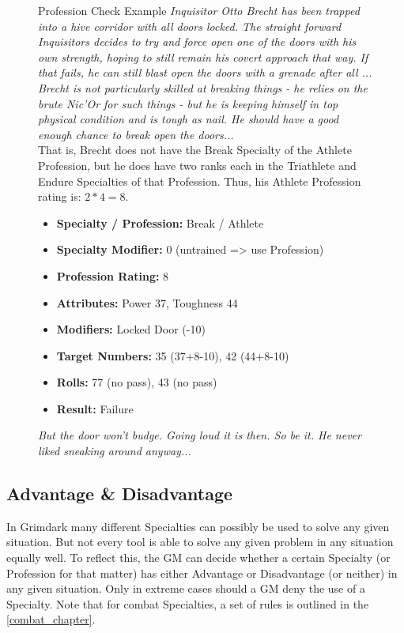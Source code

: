 \begin{figure}[hb]
	\begin{DndSidebar}{Profession Check Example}
	\textit{Inquisitor Otto Brecht has been trapped into a hive corridor with all doors locked. The straight forward Inquisitors decides to try and force open one of the doors with his own strength, hoping to still remain his covert approach that way. If that fails, he can still blast open the doors with a grenade after all ...\\
	\noindent
	Brecht is not particularly skilled at breaking things - he relies on the brute Nic'Or for such things - but he is keeping himself in top physical condition and is tough as nail. He should have a good enough chance to break open the doors...}\\
	\noindent
	That is, Brecht does not have the Break Specialty of the Athlete Profession, but he does have two ranks each in the Triathlete and Endure Specialties of that Profession. Thus, his Athlete Profession rating is: $2*4=8$.
		\begin{itemize}
		\item \textbf{Specialty / Profession:} Break / Athlete
		\item \textbf{Specialty Modifier:} 0 (untrained => use Profession)
		\item \textbf{Profession Rating:} 8
		\item \textbf{Attributes:} Power 37, Toughness 44
		\item \textbf{Modifiers:} Locked Door (-10)
		\item \textbf{Target Numbers:} 35 (37+8-10), 42 (44+8-10)
		\item \textbf{Rolls:} 77 (no pass), 43 (no pass)
		\item \textbf{Result:} Failure
	\end{itemize}
	\textit{But the door won't budge. Going loud it is then. So be it. He never liked sneaking around anyway...}
	\end{DndSidebar}
\end{figure}

\subsection{Advantage \& Disadvantage}\label{Synergy}
In Grimdark many different Specialties can possibly be used to solve any given situation.
But not every tool is able to solve any given problem in any situation equally well.
To reflect this, the GM can decide whether a certain Specialty (or Profession for that matter) has either Advantage or Disadvantage (or neither) in any given situation.
Only in extreme cases should a GM deny the use of a Specialty.
Note that for combat Specialties, a set of rules is outlined in the \ref{combat_chapter}.

